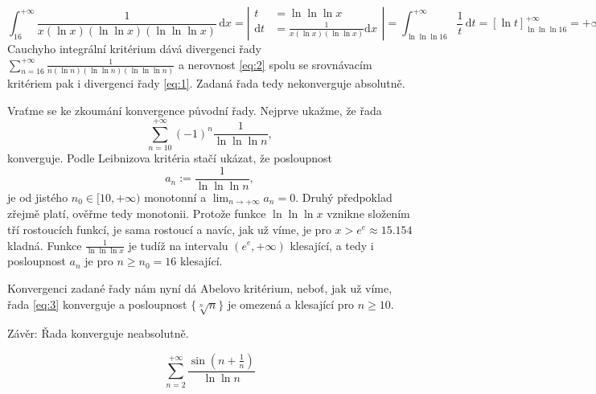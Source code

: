\documentclass[answers]{exam}
\begin{document}
\begin{questions}
\begin{solution}
  	\begin{equation*}
  		\int_{16}^{+\infty}
  			\frac{1}{x \left( \ln x \right) \left( \ln \ln x \right) \left( \ln \ln \ln x \right)}
  		\, \mathrm{d}x
  		=
	   	\left| 
		     \begin{aligned}
		       t &= \ln \ln \ln x
		       \\
		       \mathrm{d}t &= \frac{1}{x \left( \ln x \right) \left( \ln \ln x \right)} \mathrm{d}x
		     \end{aligned}
		   \right|  		
		   =
		   \int_{\ln \ln \ln 16}^{+\infty}
		      	\frac{1}{t}
		   \, \mathrm{d}t
		   =
		   \left[
		      	\ln t
		   \right]_{\ln \ln \ln 16}^{+\infty}
		   =
		   +\infty,
  	\end{equation*}
  	Cauchyho integrální kritérium dává divergenci řady $\sum_{n = 16}^{+\infty} \frac{1}{n \left( \ln n \right) \left( \ln \ln n \right) \left( \ln \ln \ln n \right)}$ a nerovnost \eqref{eq:2} spolu se srovnávacím kritériem pak i divergenci řady \eqref{eq:1}. Zadaná řada tedy nekonverguje absolutně.
  	
		Vraťme se ke zkoumání konvergence původní řady. Nejprve ukažme, že řada
  	\begin{equation}
	  	\label{eq:3}
	    \sum_{n = 10}^{+\infty}
			\left( -1 \right)^n
			\frac{1}{\ln \ln \ln n}, 		
  	\end{equation}
  	konverguje. Podle Leibnizova kritéria stačí ukázat, že posloupnost
  	\begin{equation*}
  		a_n := \frac{1}{\ln \ln \ln n},
  	\end{equation*}
  	je od jistého $n_0 \in [10, +\infty)$ monotonní a $\lim_{n \to+ \infty} a_n = 0$. Druhý předpoklad zřejmě platí, ověřme tedy monotonii. Protože funkce $\ln \ln \ln x$ vznikne složením tří rostoucích funkcí, je sama rostoucí a navíc, jak už víme, je pro $x > e^e \approx 15.154$ kladná. Funkce $\frac{1}{\ln \ln \ln x}$ je tudíž na intervalu $(e^e, +\infty)$ klesající, a tedy i posloupnost $a_n$ je pro $n \ge n_0 = 16$ klesající.
  	
  	Konvergenci zadané řady nám nyní dá Abelovo kritérium, neboť, jak už víme, řada \eqref{eq:3} konverguje a posloupnost $\{ \sqrt[n]{n} \}$ je  omezená a klesající pro $n \ge 10$.
  	
  	Závěr: Řada konverguje neabsolutně.
  \end{solution}
  
  \question
  \begin{equation*}
    \sum_{n = 2}^{+\infty}
		\frac{\sin \left( n + \frac{1}{n} \right)}{\ln \ln n}
  \end{equation*}
  

\end{questions}
\end{document}

